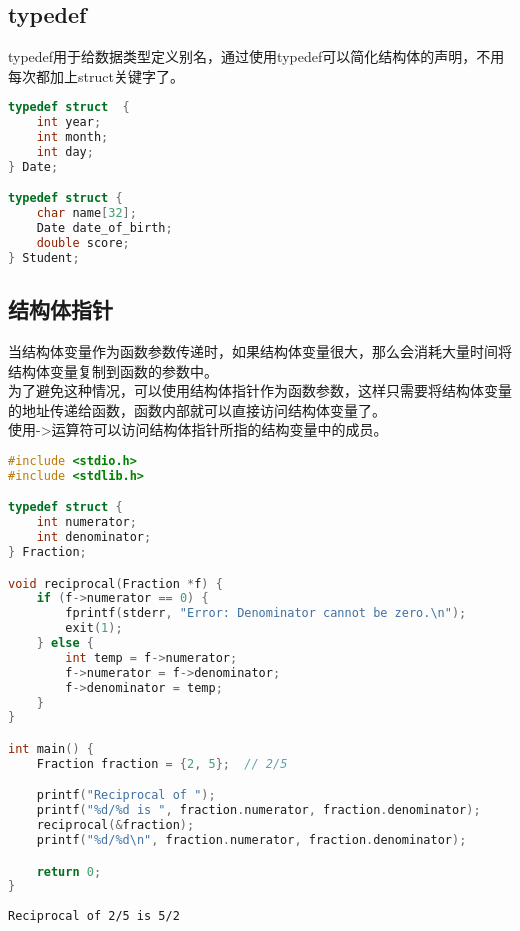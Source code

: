 \vspace{0.5cm}

\subsection{typedef}

typedef用于给数据类型定义别名，通过使用typedef可以简化结构体的声明，不用每次都加上struct关键字了。

\vspace{-0.5cm}
\begin{lstlisting}[language=C]
typedef struct  {
    int year;
    int month;
    int day;
} Date;

typedef struct {
    char name[32];
    Date date_of_birth;
    double score;
} Student;
\end{lstlisting}

\vspace{0.5cm}

\subsection{结构体指针}

当结构体变量作为函数参数传递时，如果结构体变量很大，那么会消耗大量时间将结构体变量复制到函数的参数中。\\

为了避免这种情况，可以使用结构体指针作为函数参数，这样只需要将结构体变量的地址传递给函数，函数内部就可以直接访问结构体变量了。\\

使用->运算符可以访问结构体指针所指的结构变量中的成员。\\


\begin{lstlisting}[language=C]
#include <stdio.h>
#include <stdlib.h>

typedef struct {
    int numerator;
    int denominator;
} Fraction;

void reciprocal(Fraction *f) {
    if (f->numerator == 0) {
        fprintf(stderr, "Error: Denominator cannot be zero.\n");
        exit(1);
    } else {
        int temp = f->numerator;
        f->numerator = f->denominator;
        f->denominator = temp;
    }
}

int main() {
    Fraction fraction = {2, 5};  // 2/5

    printf("Reciprocal of ");
    printf("%d/%d is ", fraction.numerator, fraction.denominator);
    reciprocal(&fraction);
    printf("%d/%d\n", fraction.numerator, fraction.denominator);

    return 0;
}
\end{lstlisting}

\begin{tcolorbox}
    \begin{verbatim}
Reciprocal of 2/5 is 5/2
	\end{verbatim}
\end{tcolorbox}

\newpage